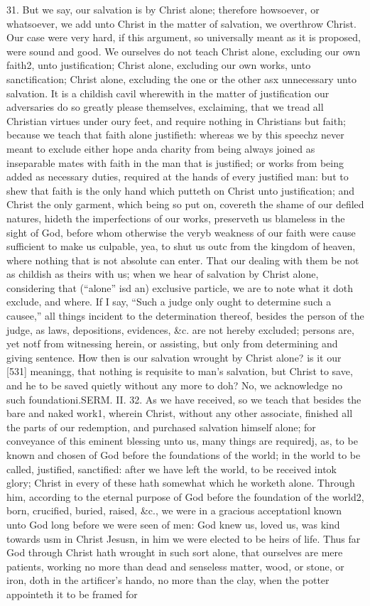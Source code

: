 31. But we say, our salvation is by Christ alone; therefore howsoever, or whatsoever, we add unto Christ in the matter of salvation, we overthrow Christ. Our case were very hard, if this argument, so universally meant as it is proposed, were sound and good. We ourselves do not teach Christ alone, excluding our own faith2, unto justification; Christ alone, excluding our own works, unto sanctification; Christ alone, excluding the one or the other asx unnecessary unto salvation. It is a childish cavil wherewith in the matter of justification our adversaries do so greatly please themselves, exclaiming, that we tread all Christian virtues under oury feet, and require nothing in Christians but faith; because we teach that faith alone justifieth: whereas we by this speechz never meant to exclude either hope anda charity from being always joined as inseparable mates with faith in the man that is justified; or works from being added as necessary duties, required at the hands of every justified man: but to shew that faith is the only hand which putteth on Christ unto justification; and Christ the only garment, which being so put on, covereth the shame of our defiled natures, hideth the imperfections of our works, preserveth us blameless in the sight of God, before whom otherwise the veryb weakness of our faith were cause sufficient to make us culpable, yea, to shut us outc from the kingdom of heaven, where nothing that is not absolute can enter. That our dealing with them be not as childish as theirs with us; when we hear of salvation by Christ alone, considering that (“alone” isd an) exclusive particle, we are to note what it doth exclude, and where. If I say, “Such a judge only ought to determine such a causee,” all things incident to the determination thereof, besides the person of the judge, as laws, depositions, evidences, &c. are not hereby excluded; persons are, yet notf from witnessing herein, or assisting, but only from determining and giving sentence. How then is our salvation wrought by Christ alone? is it our [531] meaningg, that nothing is requisite to man’s salvation, but Christ to save, and he to be saved quietly without any more to doh? No, we acknowledge no such foundationi.SERM. II. 32. As we have received, so we teach that besides the bare and naked work1, wherein Christ, without any other associate, finished all the parts of our redemption, and purchased salvation himself alone; for conveyance of this eminent blessing unto us, many things are requiredj, as, to be known and chosen of God before the foundations of the world; in the world to be called, justified, sanctified: after we have left the world, to be received intok glory; Christ in every of these hath somewhat which he worketh alone. Through him, according to the eternal purpose of God before the foundation of the world2, born, crucified, buried, raised, &c., we were in a gracious acceptationl known unto God long before we were seen of men: God knew us, loved us, was kind towards usm in Christ Jesusn, in him we were elected to be heirs of life. Thus far God through Christ hath wrought in such sort alone, that ourselves are mere patients, working no more than dead and senseless matter, wood, or stone, or iron, doth in the artificer’s hando, no more than the clay, when the potter appointeth it to be framed for 